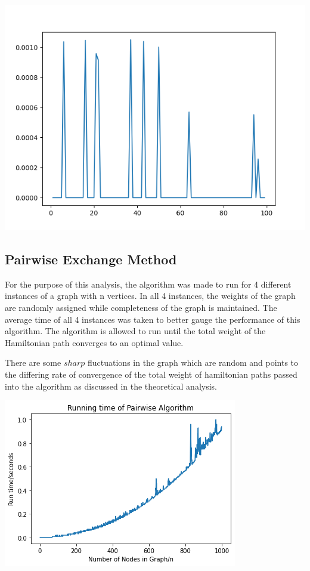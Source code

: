 \documentclass[12pt]{report}
\begin{document}
\begin{center}
    \includegraphics[scale = 0.7]{images/NN1fig2.png}
\end{center}

\subsection{Pairwise Exchange Method}

For the purpose of this analysis, the algorithm was made to run for 4 different instances of a graph with n vertices. In all 4 instances, the weights of the graph are randomly assigned while completeness of the graph is maintained. The average time of all 4 instances was taken to better gauge the performance of this algorithm. The algorithm is allowed to run until the total weight of the Hamiltonian path converges to an optimal value.

There are some $sharp$ fluctuations in the graph which are random and points to the differing rate of convergence of the total weight of hamiltonian paths passed into the algorithm as discussed in the theoretical analysis. 

\begin{center}
    \includegraphics[scale = 0.75]{2_opt.png}
\end{center}
\end{document}
